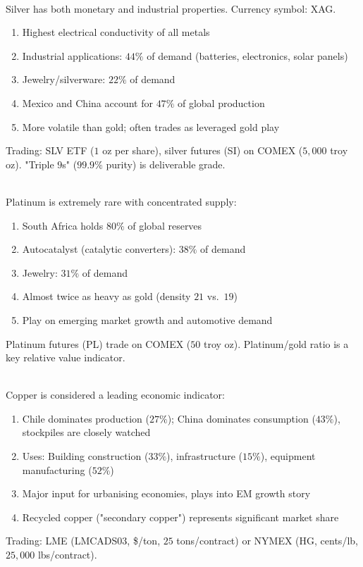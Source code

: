 \begin{remark} \\
Silver has both monetary and industrial properties. Currency symbol: XAG.
\begin{enumerate}[label=\roman*.]
\setlength{\itemsep}{0pt}
\item Highest electrical conductivity of all metals
\item Industrial applications: $44\%$ of demand (batteries, electronics, solar panels)
\item Jewelry/silverware: $22\%$ of demand
\item Mexico and China account for $47\%$ of global production
\item More volatile than gold; often trades as leveraged gold play
\end{enumerate}
Trading: SLV ETF ($1$ oz per share), silver futures (SI) on COMEX ($5,000$ troy oz). "Triple $9$s" ($99.9\%$ purity) is deliverable grade.
\end{remark}

\begin{remark} \\
Platinum is extremely rare with concentrated supply:
\begin{enumerate}[label=\roman*.]
\setlength{\itemsep}{0pt}
\item South Africa holds $80\%$ of global reserves
\item Autocatalyst (catalytic converters): $38\%$ of demand
\item Jewelry: $31\%$ of demand
\item Almost twice as heavy as gold (density $21$ vs.\ $19$)
\item Play on emerging market growth and automotive demand
\end{enumerate}
Platinum futures (PL) trade on COMEX ($50$ troy oz). Platinum/gold ratio is a key relative value indicator.
\end{remark}

\begin{remark} \\
Copper is considered a leading economic indicator:
\begin{enumerate}[label=\roman*.]
\setlength{\itemsep}{0pt}
\item Chile dominates production ($27\%$); China dominates consumption ($43\%$), stockpiles are closely watched
\item Uses: Building construction ($33\%$), infrastructure ($15\%$), equipment manufacturing ($52\%$)
\item Major input for urbanising economies, plays into EM growth story
\item Recycled copper ("secondary copper") represents significant market share
\end{enumerate}
Trading: LME (LMCADS03, \$/ton, $25$ tons/contract) or NYMEX (HG, cents/lb, $25,000$ lbs/contract).
\end{remark}

